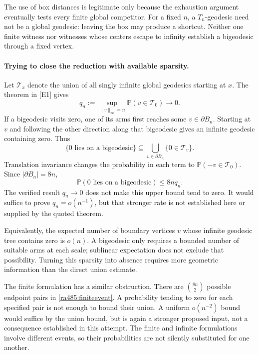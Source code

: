 \documentclass[11pt]{article}
\begin{document}
The use of box distances is legitimate only because the exhaustion
argument eventually tests every finite global competitor. For a fixed
$n$, a $T_n$-geodesic need not be a global geodesic: leaving the box may
produce a shortcut. Neither one finite witness nor witnesses whose
centers escape to infinity establish a bigeodesic through a fixed vertex.

\paragraph{Trying to close the reduction with available sparsity.}
Let $\mathcal T_x$ denote the union of all singly infinite global
geodesics starting at $x$. The theorem in [E1] gives
\[
 q_n:=\sup_{\|v\|_\infty=n}\mathbb P(v\in\mathcal T_0)
                              \longrightarrow0.
\]
If a bigeodesic visits zero, one of its arms first reaches some
$v\in\partial B_n$. Starting at $v$ and following the other direction
along that bigeodesic gives an infinite geodesic containing zero. Thus
\[
 \{0\text{ lies on a bigeodesic}\}
       \subseteq\bigcup_{v\in\partial B_n}\{0\in\mathcal T_v\}.
\]
Translation invariance changes the probability in each term to
$\mathbb P(-v\in\mathcal T_0)$. Since $|\partial B_n|=8n$,
\begin{equation}\label{ra485:unionloss}
 \mathbb P(0\text{ lies on a bigeodesic})\leq8nq_n.
\end{equation}
The verified result $q_n\to0$ does not make this upper bound tend to
zero. It would suffice to prove $q_n=o(n^{-1})$, but that stronger rate
is not established here or supplied by the quoted theorem.

Equivalently, the expected number of boundary vertices $v$ whose infinite
geodesic tree contains zero is $o(n)$. A bigeodesic only requires a
bounded number of suitable arms at each scale; sublinear expectation
does not exclude that possibility. Turning this sparsity into absence
requires more geometric information than the direct union estimate.

The finite formulation has a similar obstruction. There are
$\binom{8n}{2}$ possible endpoint pairs in
\eqref{ra485:finiteevent}. A probability tending to zero for each
specified pair is not enough to bound their union. A uniform
$o(n^{-2})$ bound would suffice by the union bound, but is again a
stronger proposed input, not a consequence established in this attempt.
The finite and infinite formulations involve different events, so their
probabilities are not silently substituted for one another.
\end{document}
